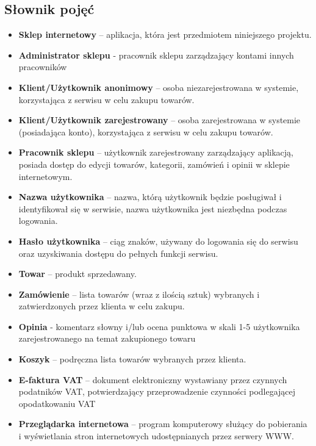 \documentclass[10pt,a4paper]{article}
\begin{document}
    \subsection{Słownik pojęć}
        \begin{itemize}
		  \item \textbf{Sklep internetowy} – aplikacja, która jest przedmiotem niniejszego projektu.
		  \item \textbf{Administrator sklepu} - pracownik sklepu zarządzający kontami innych pracowników
          \item \textbf{Klient/Użytkownik anonimowy} – osoba niezarejestrowana w systemie,
           	    		korzystająca z serwisu w celu zakupu towarów.
		  \item \textbf{Klient/Użytkownik zarejestrowany} – osoba zarejestrowana w systemie (posiadająca konto),
		  				korzystająca z serwisu w celu zakupu towarów.
		  \item \textbf{Pracownik sklepu} – użytkownik zarejestrowany zarządzający aplikacją, posiada dostęp do edycji 									towarów, kategorii, zamówień i opinii w sklepie internetowym.
		  \item \textbf{Nazwa użytkownika} – nazwa, którą użytkownik będzie posługiwał i identyfikował się w serwisie,
		  	    		nazwa użytkownika jest niezbędna podczas logowania.
		  \item \textbf{Hasło użytkownika} – ciąg znaków, używany do logowania się do serwisu oraz uzyskiwania dostępu 
		  				do pełnych funkcji serwisu.
		  \item \textbf{Towar} – produkt sprzedawany.
		  \item \textbf{Zamówienie} – lista towarów (wraz z ilością sztuk) wybranych i zatwierdzonych przez 
		  				klienta w celu zakupu.
		  \item \textbf{Opinia} - komentarz słowny i/lub ocena punktowa w skali 1-5 użytkownika zarejestrowanego 
		  				na temat zakupionego towaru
		  \item \textbf{Koszyk} – podręczna lista towarów wybranych przez klienta.
		  \item \textbf{E-faktura VAT} – dokument elektroniczny wystawiany przez czynnych podatników VAT, 
		  				potwierdzający przeprowadzenie czynności podlegającej opodatkowaniu VAT
		  \item \textbf{Przeglądarka internetowa} – program komputerowy służący do pobierania i 
		  	    		wyświetlania stron internetowych udostępnianych przez serwery WWW.
		\end{itemize}
		
\end{document}
